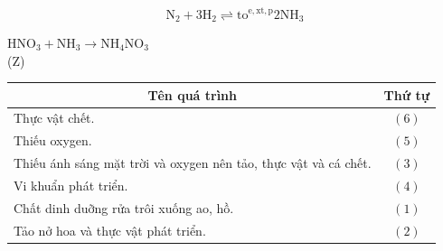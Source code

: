 \documentclass[10pt]{article}
\begin{document}
\begin{equation*}
\mathrm{N}_{2}+3 \mathrm{H}_{2} \rightleftharpoons \mathrm{to}^{\mathrm{e}, \mathrm{xt}, \mathrm{p}} 2 \mathrm{NH}_{3} \tag{Q}
\end{equation*}


$\mathrm{HNO}_{3}+\mathrm{NH}_{3} \longrightarrow \mathrm{NH}_{4} \mathrm{NO}_{3}$\\
(Z)

\begin{center}
\begin{tabular}{|l|c|}
\multicolumn{1}{|c|}{Tên quá trình} & Thứ tự \\
\hline
Thực vật chết. & $(6)$ \\
\hline
Thiếu oxygen. & $(5)$ \\
\hline
Thiếu ánh sáng mặt trời và oxygen nên tảo, thực vật và cá chết. & $(3)$ \\
\hline
Vi khuẩn phát triển. & $(4)$ \\
\hline
Chất dinh duỡng rửa trôi xuống ao, hồ. & $(1)$ \\
\hline
Tảo nở hoa và thực vật phát triển. & $(2)$ \\
\hline
\end{tabular}
\end{center}
\end{document}
